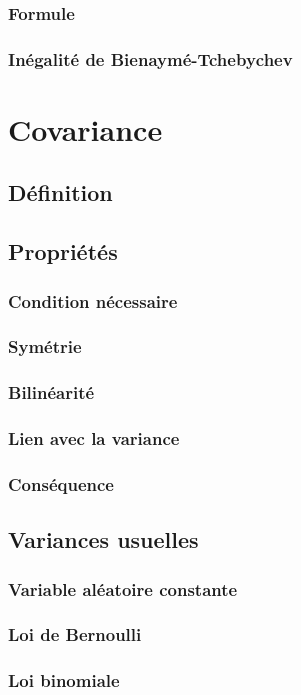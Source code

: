 \documentclass[12pt,a4paper,french]{book}
\begin{document}
			\subsubsection{Formule}
			\subsubsection{Inégalité de Bienaymé-Tchebychev}
	\section{Covariance}
		\subsection{Définition}
		\subsection{Propriétés}
			\subsubsection{Condition nécessaire}
			\subsubsection{Symétrie}
			\subsubsection{Bilinéarité}
			\subsubsection{Lien avec la variance}
			\subsubsection{Conséquence}
		\subsection{Variances usuelles}
			\subsubsection{Variable aléatoire constante}
			\subsubsection{Loi de Bernoulli}
			\subsubsection{Loi binomiale}
	
	
\end{document}
